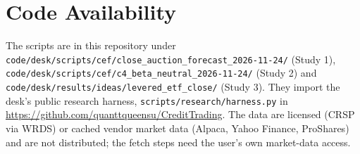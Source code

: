 \documentclass[10pt, a4paper, twocolumn]{article}
\begin{document}
\section*{Code Availability}

{\raggedright
The scripts are in this repository under \nolinkurl{code/desk/scripts/cef/close_auction_forecast_2026-11-24/} (Study 1), \nolinkurl{code/desk/scripts/cef/c4_beta_neutral_2026-11-24/} (Study 2) and \nolinkurl{code/desk/results/ideas/levered_etf_close/} (Study 3). They import the desk's public research harness, \texttt{scripts/research/harness.py} in \url{https://github.com/quanttqueensu/CreditTrading}. The data are licensed (CRSP via WRDS) or cached vendor market data (Alpaca, Yahoo Finance, ProShares) and are not distributed; the fetch steps need the user's own market-data access.\par}
\end{document}

